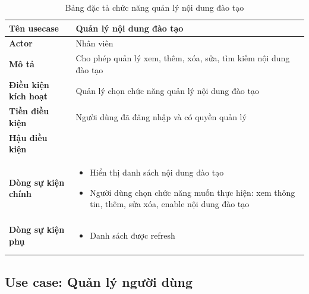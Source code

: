 \documentclass[report.tex]{subfiles}
\begin{document}
\begin{table}[!ht]
\begin{longtable}{|p{4cm}|p{12cm}|}
\hline
\textbf{Tên usecase} & \textbf{Quản lý nội dung đào tạo} \\
\hline
\textbf{Actor} & Nhân viên\\
\hline
\textbf{Mô tả} & Cho phép quản lý xem, thêm, xóa, sửa, tìm kiếm nội dung đào tạo \\
\hline
\textbf{Điều kiện kích hoạt} & Quản lý chọn chức năng quản lý nội dung đào tạo \\
\hline
\textbf{Tiền điều kiện} & Người dùng đã đăng nhập và có quyền quản lý \\
\hline
\textbf{Hậu điều kiện} & \\
\hline
\textbf{Dòng sự kiện chính} &
\begin{itemize}[noitemsep]
  \item Hiển thị danh sách nội dung đào tạo
  \item Người dùng chọn chức năng muốn thực hiện: xem thông tin, thêm, sửa xóa, enable nội dung đào tạo
\end{itemize}\\
\hline
\textbf{Dòng sự kiện phụ} & 
\begin{itemize}[noitemsep]
  \item Danh sách được refresh
\end{itemize}\\
\hline
\caption{Bảng đặc tả chức năng quản lý nội dung đào tạo}
\end{longtable}
\end{table}
\FloatBarrier



\subsection{Use case: Quản lý người dùng}
\end{document}
